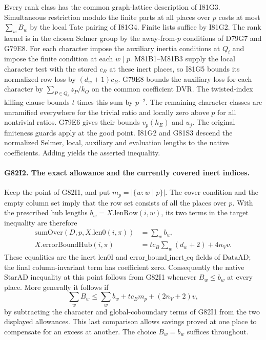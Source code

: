 Every rank class has the common graph-lattice description of
I81G3. Simultaneous restriction modulo the finite parts at all
places over $p$ costs at most $\sum_w B_w$ by the local Tate
pairing of I81G4. Finite lists suffice by I81G2. The rank
kernel is in the chosen Selmer group by the away-from-$p$
conditions of D79G7 and G79E8. For each character impose the
auxiliary inertia conditions at $Q_i$ and impose the finite
condition at each $w\mid p$. M81B1--M81B3 supply the local
character test with the stored $c_B$ at these inert places, so
I81G5 bounds its normalized row loss by $(d_w+1)c_B$.
G79E8 bounds the auxiliary loss for each character by
$\sum_{P\in Q_i} z_P/k_O$ on the common coefficient DVR. The
twisted-index killing clause bounds $t$ times this sum by $p^{-2}$.
The remaining character classes are unramified everywhere for
the trivial ratio and locally zero above $p$ for all nontrivial
ratios. G79E6 gives their bounds $v_p(h_E)$ and $u_j$.
The original finiteness guards apply at the good point. I81G2
and G81S3 descend the normalized Selmer, local, auxiliary and
evaluation lengths to the native coefficients. Adding yields
the asserted inequality.

\paragraph{G82I2. The exact allowance and the currently covered inert indices.}
Keep the point of G82I1, and put $m_p=|\{w:w\mid p\}|$.
The cover condition and the empty column set imply that the
row set consists of all the places over $p$. With the prescribed
hub lengths $b_w=X.\mathrm{lenRow}(i,w)$, its two terms in
the target inequality are therefore
\[
\begin{aligned}
 \mathrm{sumOver}(D,p,X.\mathrm{len0}(i,\pi))&=\sum_w b_w,\\
 X.\mathrm{errorBoundHub}(i,\pi)
               &=t c_B\sum_w(d_w+2)+4n_Vv .
\end{aligned}
\]
These equalities are the inert $\mathrm{len0I}$ and
$\mathrm{error\_bound\_inert\_eq}$ fields of $\mathrm{DataAD}$;
the final column-invariant term has coefficient zero. Consequently
the native $\mathrm{StarAD}$ inequality at this point follows
from G82I1 whenever $B_w\le b_w$ at every place. More generally
it follows if
\[
           \sum_w B_w\le\sum_w b_w+t c_B m_p+(2n_V+2)v ,
\]
by subtracting the character and global-coboundary terms of
G82I1 from the two displayed allowances. This last comparison
allows savings proved at one place to compensate for an excess
at another. The choice $B_w=b_w$ suffices throughout.

